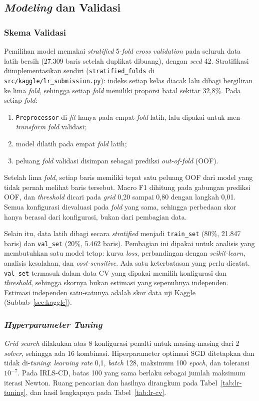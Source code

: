 \subsection{\textit{Modeling} dan Validasi}
\label{subsec:lr-validasi}

\subsubsection{Skema Validasi}
Pemilihan model memakai \textit{stratified} 5-\textit{fold cross validation} pada seluruh data latih bersih (27.309 baris setelah duplikat dibuang), dengan \textit{seed} 42. Stratifikasi diimplementasikan sendiri (\texttt{stratified\_folds} di \nolinkurl{src/kaggle/lr_submission.py}): indeks setiap kelas diacak lalu dibagi bergiliran ke lima \textit{fold}, sehingga setiap \textit{fold} memiliki proporsi batal sekitar 32,8\%. Pada setiap \textit{fold}:
\begin{enumerate}
	\item \texttt{Preprocessor} di-\textit{fit} hanya pada empat \textit{fold} latih, lalu dipakai untuk men-\textit{transform} \textit{fold} validasi;
	\item model dilatih pada empat \textit{fold} latih;
	\item peluang \textit{fold} validasi disimpan sebagai prediksi \textit{out-of-fold} (OOF).
\end{enumerate}
Setelah lima \textit{fold}, setiap baris memiliki tepat satu peluang OOF dari model yang tidak pernah melihat baris tersebut. Macro F1 dihitung pada gabungan prediksi OOF, dan \textit{threshold} dicari pada \textit{grid} 0,20 sampai 0,80 dengan langkah 0,01. Semua konfigurasi dievaluasi pada \textit{fold} yang sama, sehingga perbedaan skor hanya berasal dari konfigurasi, bukan dari pembagian data.

Selain itu, data latih dibagi secara \textit{stratified} menjadi \texttt{train\_set} (80\%, 21.847 baris) dan \texttt{val\_set} (20\%, 5.462 baris). Pembagian ini dipakai untuk analisis yang membutuhkan satu model tetap: kurva \textit{loss}, perbandingan dengan \textit{scikit-learn}, analisis kesalahan, dan \textit{cost-sensitive}. Ada satu keterbatasan yang perlu dicatat. \texttt{val\_set} termasuk dalam data CV yang dipakai memilih konfigurasi dan \textit{threshold}, sehingga skornya bukan estimasi yang sepenuhnya independen. Estimasi independen satu-satunya adalah skor data uji Kaggle (Subbab~\ref{sec:kaggle}).

\subsubsection{\textit{Hyperparameter Tuning}}
\textit{Grid search} dilakukan atas 8 konfigurasi penalti untuk masing-masing dari 2 \textit{solver}, sehingga ada 16 kombinasi. Hiperparameter optimasi SGD ditetapkan dan tidak di-\textit{tuning}: \textit{learning rate} 0,1, \textit{batch} 128, maksimum 100 \textit{epoch}, dan toleransi $10^{-7}$. Pada IRLS-CD, batas 100 yang sama berlaku sebagai jumlah maksimum iterasi Newton. Ruang pencarian dan hasilnya dirangkum pada Tabel~\ref{tab:lr-tuning}, dan hasil lengkapnya pada Tabel~\ref{tab:lr-cv}.

